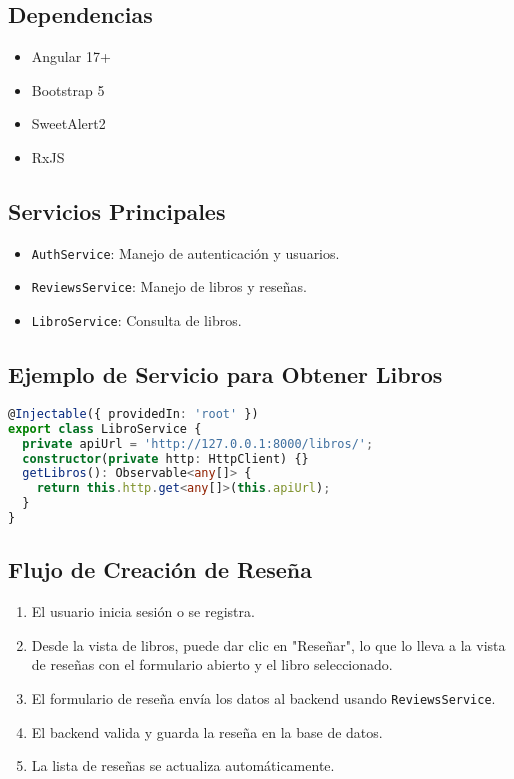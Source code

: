 \documentclass[10pt,a4paper]{article}
\begin{document}
\subsection{Dependencias}
\begin{itemize}
    \item Angular 17+
    \item Bootstrap 5
    \item SweetAlert2
    \item RxJS
\end{itemize}

\subsection{Servicios Principales}
\begin{itemize}
    \item \texttt{AuthService}: Manejo de autenticación y usuarios.
    \item \texttt{ReviewsService}: Manejo de libros y reseñas.
    \item \texttt{LibroService}: Consulta de libros.
\end{itemize}

\subsection{Ejemplo de Servicio para Obtener Libros}
\begin{lstlisting}[language=TypeScript]
@Injectable({ providedIn: 'root' })
export class LibroService {
  private apiUrl = 'http://127.0.0.1:8000/libros/';
  constructor(private http: HttpClient) {}
  getLibros(): Observable<any[]> {
    return this.http.get<any[]>(this.apiUrl);
  }
}
\end{lstlisting}

\subsection{Flujo de Creación de Reseña}
\begin{enumerate}
    \item El usuario inicia sesión o se registra.
    \item Desde la vista de libros, puede dar clic en "Reseñar", lo que lo lleva a la vista de reseñas con el formulario abierto y el libro seleccionado.
    \item El formulario de reseña envía los datos al backend usando \texttt{ReviewsService}.
    \item El backend valida y guarda la reseña en la base de datos.
    \item La lista de reseñas se actualiza automáticamente.
\end{enumerate}
\end{document}
